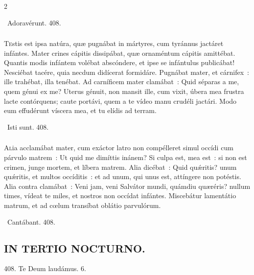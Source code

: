 \documentclass[9pt,twoside]{extarticle}
\begin{document}
\begin{multicols}{2}
\begin{tightlist}{}
\item {}~Adoravérunt. 408.
\end{tightlist}

\subsubsection*{\center {}}
\lettrine{T}estis est ipsa natúra, quæ pugnábat in mártyres, cum tyránnus jactáret infántes. Mater crines cápitis dissipábat, quæ ornaméntum cápitis amittébat. Quantis modis infántem volébat abscóndere, et ipse se infántulus publicábat! Nesciébat tacére, quia necdum didícerat formidáre. Pugnábat mater, et cárnifex~: ille trahébat, illa tenébat. Ad carníficem mater clamábat~: Quid séparas a me, quem génui ex me? Uterus génuit, non mansit ille, cum vixit, úbera mea frustra lacte contórquens; caute portávi, quem a te vídeo manu crudéli jactári. Modo eum effudérunt víscera mea, et tu elídis ad terram.

\begin{tightlist}{}
\item {}~Isti sunt. 408.
\end{tightlist}

\subsubsection*{\center {}}
\lettrine{A}lia acclamábat mater, cum exáctor latro non compélleret simul occídi cum párvulo matrem~: Ut quid me dimíttis inánem? Si culpa est, mea est~: si non est crimen, junge mortem, et líbera matrem. Alia dicébat~: Quid quǽritis? unum quǽritis, et multos occíditis~: et ad unum, qui unus est, attíngere non potéstis. Alia contra clamábat~: Veni jam, veni Salvátor mundi, quámdiu quæréris? nullum times, vídeat te miles, et nostros non occídat infántes. Miscebátur lamentátio matrum, et ad cœlum transíbat oblátio parvulórum.

\begin{tightlist}{}
\item {}~Cantábant. 408.
\end{tightlist}

\subsection*{\center \textsc{IN TERTIO NOCTURNO.}}
\begin{tightlist}{}
\item {} 408.  Te Deum laudámus. 6.
\item {}
\end{tightlist}



\end{multicols}
\end{document}
